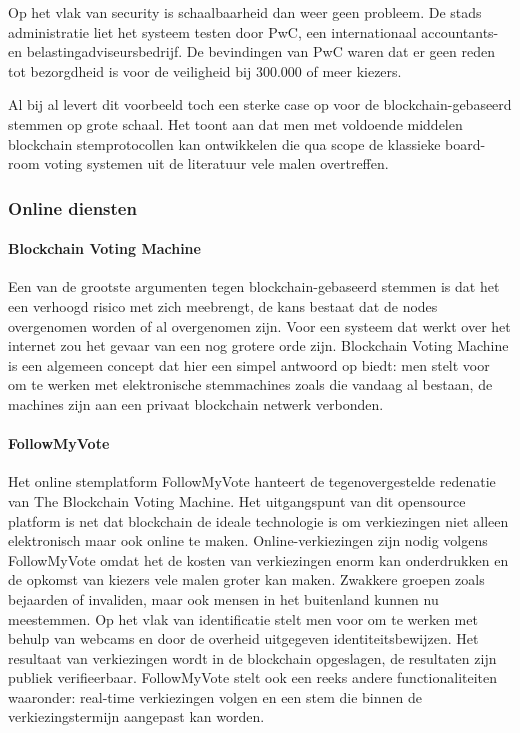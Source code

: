 				Op het vlak van security is schaalbaarheid dan weer geen probleem. De stads administratie liet het systeem testen door PwC, een internationaal accountants- en belastingadviseursbedrijf. De bevindingen van PwC waren dat er geen reden tot bezorgdheid is voor de veiligheid bij  300.000 of meer kiezers. 
				
				Al bij al levert dit voorbeeld toch een sterke case op voor de blockchain-gebaseerd stemmen op grote schaal. Het toont aan dat men met voldoende middelen blockchain stemprotocollen kan ontwikkelen die qua scope de klassieke board-room voting systemen uit de literatuur vele malen overtreffen. 
			\subsubsection{Online diensten}
				\paragraph{Blockchain Voting Machine }
					Een van de grootste argumenten tegen blockchain-gebaseerd stemmen is dat het een verhoogd risico met zich meebrengt, de kans bestaat dat de nodes overgenomen worden of al overgenomen zijn. Voor een systeem dat werkt over het internet zou het gevaar van een nog grotere orde zijn. Blockchain Voting Machine is een algemeen concept dat hier een simpel antwoord op biedt: men stelt voor om te werken met elektronische stemmachines zoals die vandaag al bestaan,  de machines zijn aan een privaat blockchain netwerk verbonden. 
				\paragraph{FollowMyVote}
					Het online stemplatform FollowMyVote hanteert de tegenovergestelde redenatie van The Blockchain Voting Machine. Het uitgangspunt van dit opensource platform is net dat blockchain de ideale technologie is om verkiezingen niet alleen elektronisch maar ook online te maken. Online-verkiezingen zijn nodig volgens FollowMyVote omdat het de kosten van verkiezingen enorm kan onderdrukken en de opkomst van kiezers vele malen groter kan maken.  Zwakkere groepen zoals bejaarden of invaliden, maar ook mensen in het buitenland kunnen nu  meestemmen.  Op het vlak van identificatie stelt men voor om te werken met behulp van webcams en door de overheid uitgegeven identiteitsbewijzen. Het resultaat van verkiezingen wordt in de blockchain opgeslagen, de resultaten zijn publiek verifieerbaar. FollowMyVote stelt ook een reeks andere functionaliteiten waaronder: real-time verkiezingen volgen en een stem die binnen de verkiezingstermijn aangepast kan worden. 
